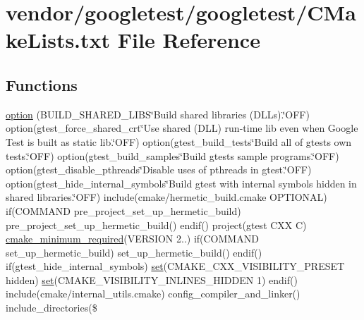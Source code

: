 \hypertarget{vendor_2googletest_2googletest_2CMakeLists_8txt}{}\section{vendor/googletest/googletest/\+C\+Make\+Lists.txt File Reference}
\label{vendor_2googletest_2googletest_2CMakeLists_8txt}
\subsection*{Functions}
\begin{DoxyCompactItemize}
\item 
\hyperlink{vendor_2googletest_2googletest_2CMakeLists_8txt_ae5f6f0871fc02d53560c2acb7b4ab27c}{option} (B\+U\+I\+L\+D\+\_\+\+S\+H\+A\+R\+E\+D\+\_\+\+L\+I\+BS\char`\"{}Build shared libraries (D\+L\+Ls).\char`\"{}O\+FF) option(gtest\+\_\+force\+\_\+shared\+\_\+crt\char`\"{}Use shared (D\+LL) run-\/time lib even when Google Test is built as static lib.\char`\"{}O\+FF) option(gtest\+\_\+build\+\_\+tests\char`\"{}Build all of gtest\textquotesingle{}s own tests.\char`\"{}O\+FF) option(gtest\+\_\+build\+\_\+samples\char`\"{}Build gtest\textquotesingle{}s sample programs.\char`\"{}O\+FF) option(gtest\+\_\+disable\+\_\+pthreads\char`\"{}Disable uses of pthreads in gtest.\char`\"{}O\+FF) option(gtest\+\_\+hide\+\_\+internal\+\_\+symbols\char`\"{}Build gtest with internal symbols hidden in shared libraries.\char`\"{}O\+FF) include(cmake/hermetic\+\_\+build.\+cmake O\+P\+T\+I\+O\+N\+AL) if(C\+O\+M\+M\+A\+ND pre\+\_\+project\+\_\+set\+\_\+up\+\_\+hermetic\+\_\+build) pre\+\_\+project\+\_\+set\+\_\+up\+\_\+hermetic\+\_\+build() endif() project(gtest C\+XX C) \hyperlink{CMakeLists_8txt_a5813863403b16ee62a7ad3383c05d50f}{cmake\+\_\+minimum\+\_\+required}(V\+E\+R\+S\+I\+ON 2..) if(C\+O\+M\+M\+A\+ND set\+\_\+up\+\_\+hermetic\+\_\+build) set\+\_\+up\+\_\+hermetic\+\_\+build() endif() if(gtest\+\_\+hide\+\_\+internal\+\_\+symbols) \hyperlink{vendor_2googletest_2googlemock_2CMakeLists_8txt_aa99cc432a5064db15e7653de9d85d2d2}{set}(C\+M\+A\+K\+E\+\_\+\+C\+X\+X\+\_\+\+V\+I\+S\+I\+B\+I\+L\+I\+T\+Y\+\_\+\+P\+R\+E\+S\+ET hidden) \hyperlink{vendor_2googletest_2googlemock_2CMakeLists_8txt_aa99cc432a5064db15e7653de9d85d2d2}{set}(C\+M\+A\+K\+E\+\_\+\+V\+I\+S\+I\+B\+I\+L\+I\+T\+Y\+\_\+\+I\+N\+L\+I\+N\+E\+S\+\_\+\+H\+I\+D\+D\+EN 1) endif() include(cmake/internal\+\_\+utils.\+cmake) config\+\_\+compiler\+\_\+and\+\_\+linker() include\+\_\+directories(\$
\end{DoxyCompactItemize}



